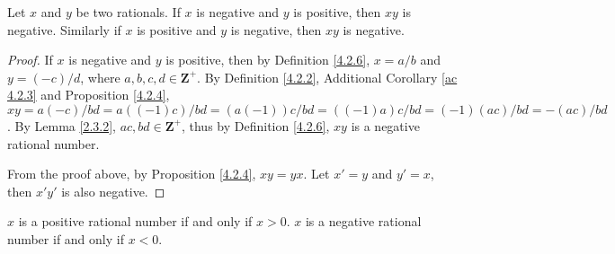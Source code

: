 \begin{additional corollary}\label{ac 4.2.6}
Let \(x\) and \(y\) be two rationals.
If \(x\) is negative and \(y\) is positive, then \(xy\) is negative.
Similarly if \(x\) is positive and \(y\) is negative, then \(xy\) is negative.
\end{additional corollary}

\begin{proof}
    If \(x\) is negative and \(y\) is positive, then by Definition \ref{4.2.6}, \(x = a / b\) and \(y = (-c) / d\), where \(a, b, c, d \in \mathbf{Z}^+\).
    By Definition \ref{4.2.2}, Additional Corollary \ref{ac 4.2.3} and Proposition \ref{4.2.4}, \(xy = a(-c) / bd = a((-1)c) / bd = (a(-1))c / bd = ((-1)a)c / bd = (-1)(ac) / bd = -(ac) / bd\).
    By Lemma \ref{2.3.2}, \(ac, bd \in \mathbf{Z}^+\), thus by Definition \ref{4.2.6}, \(xy\) is a negative rational number.

    From the proof above, by Proposition \ref{4.2.4}, \(xy = yx\).
    Let \(x' = y\) and \(y' = x\), then \(x'y'\) is also negative.
\end{proof}

\begin{additional corollary}\label{ac 4.2.7}
\(x\) is a positive rational number if and only if \(x > 0\).
\(x\) is a negative rational number if and only if \(x < 0\).
\end{additional corollary}

